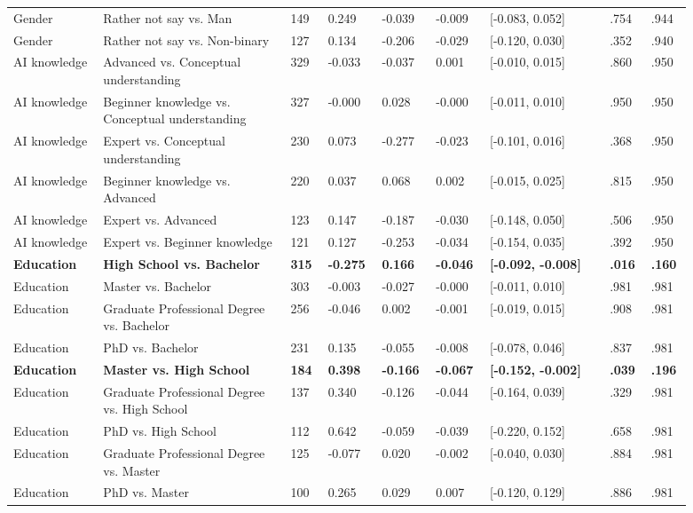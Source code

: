 {\begin{longtable}{L{0.12\linewidth}L{0.25\linewidth}R{0.05\linewidth}R{0.065\linewidth}R{0.065\linewidth}R{0.065\linewidth}R{0.16\linewidth}R{0.055\linewidth}R{0.055\linewidth}}
Gender & Rather not say vs. Man & 149 & 0.249 & -0.039 & -0.009 & [-0.083, 0.052] & .754 & .944 \\
Gender & Rather not say vs. Non-binary & 127 & 0.134 & -0.206 & -0.029 & [-0.120, 0.030] & .352 & .940 \\
\midrule
AI knowledge & Advanced vs. Conceptual understanding & 329 & -0.033 & -0.037 & 0.001 & [-0.010, 0.015] & .860 & .950 \\
AI knowledge & Beginner knowledge vs. Conceptual understanding & 327 & -0.000 & 0.028 & -0.000 & [-0.011, 0.010] & .950 & .950 \\
AI knowledge & Expert vs. Conceptual understanding & 230 & 0.073 & -0.277 & -0.023 & [-0.101, 0.016] & .368 & .950 \\
AI knowledge & Beginner knowledge vs. Advanced & 220 & 0.037 & 0.068 & 0.002 & [-0.015, 0.025] & .815 & .950 \\
AI knowledge & Expert vs. Advanced & 123 & 0.147 & -0.187 & -0.030 & [-0.148, 0.050] & .506 & .950 \\
AI knowledge & Expert vs. Beginner knowledge & 121 & 0.127 & -0.253 & -0.034 & [-0.154, 0.035] & .392 & .950 \\
\midrule
\textbf{Education} & \textbf{High School vs. Bachelor} & \textbf{315} & \textbf{-0.275} & \textbf{0.166} & \textbf{-0.046} & \textbf{[-0.092, -0.008]} & \textbf{.016} & \textbf{.160} \\
Education & Master vs. Bachelor & 303 & -0.003 & -0.027 & -0.000 & [-0.011, 0.010] & .981 & .981 \\
Education & Graduate Professional Degree vs. Bachelor & 256 & -0.046 & 0.002 & -0.001 & [-0.019, 0.015] & .908 & .981 \\
Education & PhD vs. Bachelor & 231 & 0.135 & -0.055 & -0.008 & [-0.078, 0.046] & .837 & .981 \\
\textbf{Education} & \textbf{Master vs. High School} & \textbf{184} & \textbf{0.398} & \textbf{-0.166} & \textbf{-0.067} & \textbf{[-0.152, -0.002]} & \textbf{.039} & \textbf{.196} \\
Education & Graduate Professional Degree vs. High School & 137 & 0.340 & -0.126 & -0.044 & [-0.164, 0.039] & .329 & .981 \\
Education & PhD vs. High School & 112 & 0.642 & -0.059 & -0.039 & [-0.220, 0.152] & .658 & .981 \\
Education & Graduate Professional Degree vs. Master & 125 & -0.077 & 0.020 & -0.002 & [-0.040, 0.030] & .884 & .981 \\
Education & PhD vs. Master & 100 & 0.265 & 0.029 & 0.007 & [-0.120, 0.129] & .886 & .981 \\

\end{longtable}}
